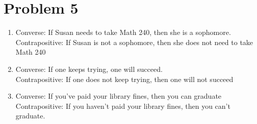 \documentclass[english]{article}
\begin{document}
\section*{Problem 5}
\begin{enumerate} [label=\alph*]
\item Converse: If Susan needs to take Math 240, then she is a sophomore.\\ Contrapositive: If Susan is not a sophomore, then she does not need to take Math 240 
\item Converse: If one keeps trying, one will succeed. \\ Contrapositive: If one does not keep trying, then one will not succeed 
\item Converse: If you've paid your library fines, then you can graduate \\
Contrapositive: If you haven't paid your library fines, then you can't graduate.
\end{enumerate}
\end{document}
